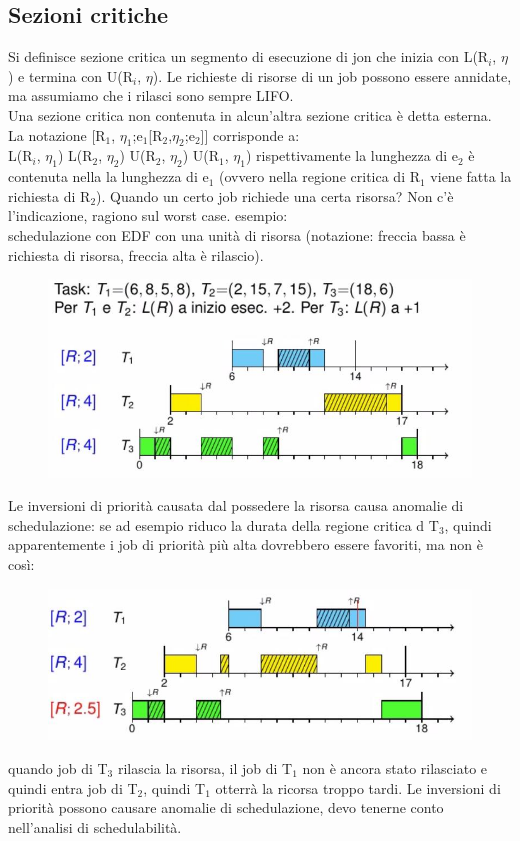 \documentclass[12pt, oneside]{extbook}
\begin{document}
\subsection{Sezioni critiche}
Si definisce sezione critica un segmento di esecuzione di jon che inizia con L(R$_{i}$, $\eta$) e termina con U(R$_{i}$, $\eta$). Le richieste di risorse di un job possono essere annidate, ma assumiamo che i rilasci sono sempre LIFO.\\ Una sezione critica non contenuta in alcun'altra sezione critica è detta esterna.\\ La notazione [R$_{1}$, $\eta_1$;e$_{1}$[R$_{2}$,$\eta_2$;e$_{2}$]] corrisponde a:\\ L(R$_{i}$, $\eta_1$) L(R$_{2}$, $\eta_2$) U(R$_{2}$, $\eta_2$) U(R$_{1}$, $\eta_1$) rispettivamente la lunghezza di e$_{2}$ è contenuta nella la lunghezza di e$_{1}$ (ovvero nella regione critica di R$_{1}$ viene fatta la richiesta di R$_{2}$). Quando un certo job richiede una certa risorsa? Non c'è l'indicazione, ragiono sul worst case. esempio:\\
schedulazione con EDF con una unità di risorsa (notazione: freccia bassa è richiesta di risorsa, freccia alta è rilascio).\\
\begin{figure}[!h]
\centering
\includegraphics[scale=0.4]{immagini/image-019.jpg}
\end{figure}
Le inversioni di priorità causata dal possedere la risorsa causa anomalie di schedulazione: se ad esempio riduco la durata della regione critica d T$_{3}$, quindi apparentemente i job di priorità più alta dovrebbero essere favoriti, ma non è così:\\ 
\begin{figure}[!h]
\centering
\includegraphics[scale=0.4]{immagini/image-020.jpg}
\end{figure}
quando job di T$_{3}$ rilascia la risorsa, il job di T$_{1}$ non è ancora stato rilasciato e quindi entra job di T$_{2}$, quindi T$_{1}$ otterrà la ricorsa troppo tardi. Le inversioni di priorità possono causare anomalie di schedulazione, devo tenerne conto nell'analisi di schedulabilità.
\end{document}
